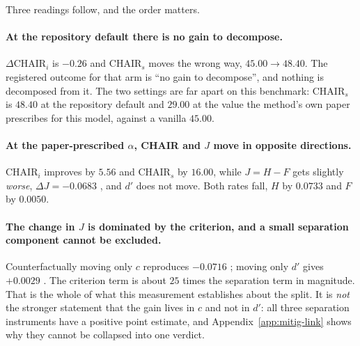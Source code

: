 Three readings follow, and the order matters.

\paragraph{At the repository default there is no gain to decompose.} $\Delta\mathrm{CHAIR}_i$ is
$-0.26$  and $\mathrm{CHAIR}_s$ moves the wrong way, $45.00 \rightarrow 48.40$.
The registered outcome for that arm is ``no gain to decompose'', and nothing is decomposed from
it. The two settings are far apart on this benchmark: $\mathrm{CHAIR}_s$ is $48.40$ at the
repository default and $29.00$ at the value the method's own paper prescribes for this model,
against a vanilla $45.00$.

\paragraph{At the paper-prescribed $\alpha$, CHAIR and $J$ move in opposite directions.}
$\mathrm{CHAIR}_i$ improves by $5.56$ and $\mathrm{CHAIR}_s$ by $16.00$, while
$J = H - F$ gets slightly \emph{worse}, $\Delta J = -0.0683$ , and $d'$ does
not move. Both rates fall, $H$ by $0.0733$ and $F$ by $0.0050$.

\paragraph{The change in $J$ is dominated by the criterion, and a small separation component cannot
be excluded.} Counterfactually moving only $c$ reproduces $-0.0716$ ; moving
only $d'$ gives $+0.0029$ . The criterion term is about $25$ times the
separation term in magnitude. That is the whole of what this measurement establishes about the
split. It is \emph{not} the stronger statement that the gain lives in $c$ and not in $d'$: all three
separation instruments have a positive point estimate, and Appendix~\ref{app:mitig-link} shows why
they cannot be collapsed into one verdict.


